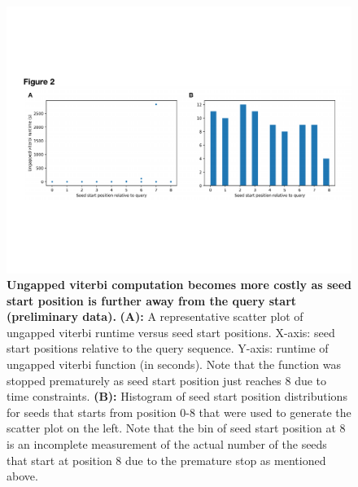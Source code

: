 \documentclass[12pt]{article}
\begin{document}
    \begin{figure}[!htb]
		\includegraphics[width=1\textwidth,trim={0.5cm 6cm 0.5cm 6.8cm},clip]{fig2} %
		\caption{\textbf{Ungapped viterbi computation becomes more costly as seed start position is further away from the query start (preliminary data).} \textbf{(A):} A representative scatter plot of ungapped viterbi runtime versus seed start positions. X-axis: seed start positions relative to the query sequence. Y-axis: runtime of ungapped viterbi function (in seconds). Note that the function was stopped prematurely as seed start position just reaches 8 due to time constraints. \textbf{(B):} Histogram of seed start position distributions for seeds that starts from position 0-8 that were used to generate the scatter plot on the left. Note that the bin of seed start position at 8 is an incomplete measurement of the actual number of the seeds that start at position 8 due to the premature stop as mentioned above.}
		
		
		
		\label{fig:unappedDistribution}
	\end{figure}	
	
\end{document}
